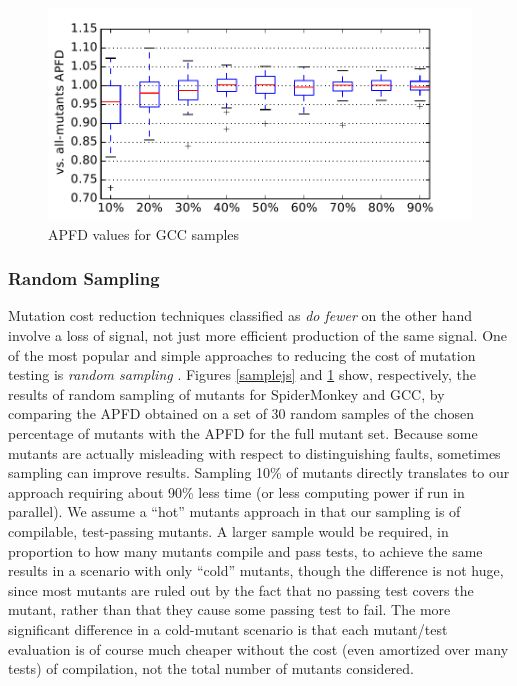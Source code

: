 \begin{figure}
  \centering
  \includegraphics[width=0.95\columnwidth]{samplegcc}
  \caption{APFD values for GCC samples}
  \label{samplegcc}
\end{figure}%

\subsubsection{Random Sampling}

Mutation cost reduction techniques classified as \emph{do fewer} on the other hand involve a loss of signal, not just more efficient production of the same signal.   One of the most popular and simple approaches to reducing the cost of mutation testing is \emph{random sampling} \cite{budd1980mutation,acree1980mutation,RahulISSRE,MutRand}.
 Figures \ref{samplejs} and \ref{samplegcc} show, respectively, the results of random sampling of mutants for SpiderMonkey and GCC, by comparing the APFD obtained on a set of 30 random samples of the chosen percentage of mutants with the APFD for the full mutant set.  Because some mutants are actually misleading with respect to distinguishing faults, sometimes sampling can improve results.  Sampling 10\% of mutants directly translates to our approach requiring about 90\% less time (or less computing power if run in parallel).  We assume a ``hot'' mutants approach in that our sampling is of compilable, test-passing mutants.  A larger sample would be required, in proportion to how many mutants compile and pass tests, to achieve the same results in a scenario with only ``cold'' mutants, though the difference is not huge, since most mutants are ruled out by the fact that no passing test covers the mutant, rather than that they cause some passing test to fail.  The more significant difference in a cold-mutant scenario is that each mutant/test evaluation is of course much cheaper without the cost (even amortized over many tests) of compilation, not the total number of mutants considered.

